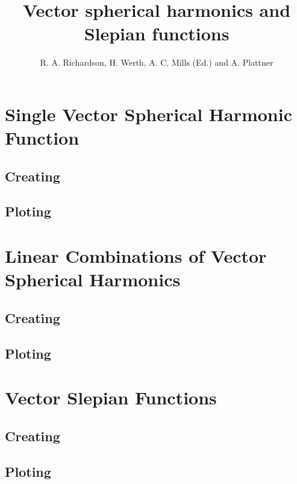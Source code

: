 \documentclass[11pt]{article}
\title{Vector spherical harmonics and Slepian functions}
\author{R. A. Richardson, H. Werth, A. C. Mills (Ed.) and A. Plattner}
\begin{document}
\maketitle
{}
\newpage
\tableofcontents
\newpage
{}

\section{Single Vector Spherical Harmonic Function}

\subsection{Creating}

\subsection{Ploting}

\section{Linear Combinations of Vector Spherical Harmonics}

\subsection{Creating}

\subsection{Ploting}

\section{Vector Slepian Functions}

\subsection{Creating}

\subsection{Ploting}
\end{document}
